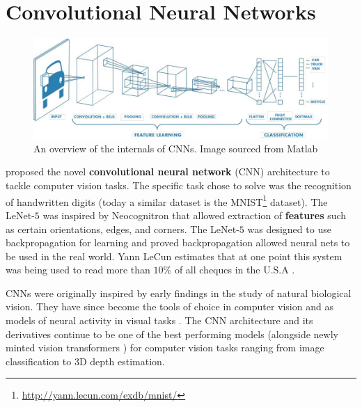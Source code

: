 
\usetikzlibrary{calc,shapes,positioning}

\chapter{Convolutional Neural Networks}\label{chap:cnn}


\begin{figure}[ht]
    \captionsetup{justification=centering}
    \centering
    \includegraphics[width=\textwidth]{chapters/assets/cnn.jpg}
    \caption{An overview of the internals of CNNs. Image sourced from Matlab\protect\footnotemark}
    \label{fig:cnn-overview}
\end{figure}
\citeauthor{LeCun1989} proposed the novel \textbf{convolutional neural network} (CNN) architecture to tackle computer vision tasks. The specific task \citeauthor{LeCun1989} chose to solve was the recognition of handwritten digits (today a similar dataset is the MNIST\footnote{\url{http://yann.lecun.com/exdb/mnist/}} dataset). The LeNet-$5$ \parencite{LeCun1989} was inspired by Neocognitron \parencite{Fukushima1975, fukushima1982neocognitron} that allowed extraction of \textbf{features} such as certain orientations, edges, and corners. The LeNet-$5$ was designed to use backpropagation for learning and proved backpropagation allowed neural nets to be used in the real world. Yann LeCun estimates that at one point this system was being used to read more than $10\%$ of all cheques in the U.S.A \parencite{chow_2021}.

CNNs were originally inspired by early findings in the study of natural biological vision. They have since become the tools of choice in computer vision and as models of neural activity in visual tasks \parencite{Kuzovkin2018, Lindsay2021, Eickenberg2017}. The CNN architecture and its derivatives continue to be one of the best performing models (alongside newly minted vision transformers \parencite{Dosovitskiy2020}) for computer vision tasks ranging from image classification to 3D depth estimation.

